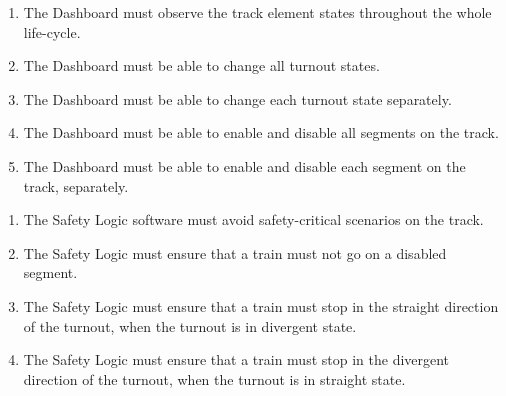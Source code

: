 \begin{enumerate}[label=REQ-DB-\arabic*, leftmargin=*, format=\small]
	\item The Dashboard must observe the track element states throughout the whole life-cycle. \label{req:DB-1}
	\item The Dashboard must be able to change all turnout states. \label{req:DB-2}
	\item The Dashboard must be able to change each turnout state separately. \label{req:DB-3}
	\item The Dashboard must be able to enable and disable all segments on the track. \label{req:DB-4}
	\item The Dashboard must be able to enable and disable each segment on the track, separately. \label{req:DB-5}
\end{enumerate}


\begin{enumerate}[label=REQ-SL-\arabic*, leftmargin=*, format=\small]
	\item The Safety Logic software must avoid safety-critical scenarios on the track. \label{req:SL-1}
	\item The Safety Logic must ensure that a train must not go on a disabled segment. \label{req:SL-2}
	\item The Safety Logic must ensure that a train must stop in the straight direction of the turnout, when the turnout is in divergent state. \label{req:SL-3}
	\item The Safety Logic must ensure that a train must stop in the divergent direction of the turnout, when the turnout is in straight state. \label{req:SL-4}
\end{enumerate}
	


